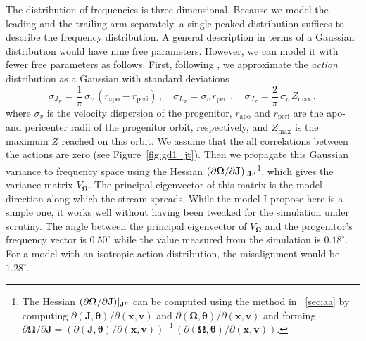 \documentclass[12pt,preprint]{aastex}
\renewcommand{\figurename}{Figure}
\renewcommand{\vec}[1]{\ensuremath{\mathbf{#1}}}
\newcommand{\vecx}{\ensuremath{\vec{x}}}
\newcommand{\vecv}{\ensuremath{\vec{v}}}
\newcommand{\vecj}{\ensuremath{\vec{J}}}
\newcommand{\veco}{\ensuremath{\vec{\Omega}}}
\newcommand{\veca}{\ensuremath{\boldsymbol\theta}}
\newcommand{\sigv}{\ensuremath{\sigma_v}}
\begin{document}
The distribution of frequencies is three dimensional. Because we model
the leading and the trailing arm separately, a single-peaked
distribution suffices to describe the frequency distribution. A
general description in terms of a Gaussian distribution would have
nine free parameters. However, we can model it with fewer free
parameters as follows. First, following \citet{Eyre11a}, we
approximate the \emph{action} distribution as a Gaussian with standard
deviations
\begin{equation}
  \sigma_{J_R} = \frac{1}{\pi}\,\sigv\,\left(r_{\mathrm{apo}}-r_{\mathrm{peri}}\right)\,,\quad 
  \sigma_{L_Z} = \sigv\,r_{\mathrm{peri}}\,,\quad 
  \sigma_{J_Z} = \frac{2}{\pi}\,\sigv\,Z_{\mathrm{max}}\,,
\end{equation}
where $\sigv$ is the velocity dispersion of the progenitor,
$r_{\mathrm{apo}}$ and $r_{\mathrm{peri}}$ are the apo- and pericenter
radii of the progenitor orbit, respectively, and $Z_{\mathrm{max}}$ is
the maximum $Z$ reached on this orbit. We assume that the all
correlations between the actions are zero (see
\figurename~\ref{fig:gd1_jt}). Then we propagate this Gaussian
variance to frequency space using the Hessian $(\partial \veco /
\partial \vecj)\large|_{\vecj^p}$\footnote{The Hessian $(\partial
  \veco / \partial \vecj)\large|_{\vecj^p}$ can be computed using the
  method in \appendixname~\ref{sec:aa} by computing $\partial
  (\vecj,\veca) / \partial (\vecx,\vecv)$ and $\partial (\veco,\veca)
  / \partial (\vecx,\vecv)$ and forming $\partial \veco / \partial
  \vecj = \left(\partial (\vecj,\veca) / \partial
  (\vecx,\vecv)\right)^{-1}\,\left(\partial (\veco,\veca) / \partial
  (\vecx,\vecv)\right)$.}, which gives the variance matrix
$V_\veco$. The principal eigenvector of this matrix is the model
direction along which the stream spreads. While the model I propose
here is a simple one, it works well without having been tweaked for
the simulation under scrutiny. The angle between the principal
eigenvector of $V_\veco$ and the progenitor's frequency vector is
$0.50^\circ$ while the value measured from the simulation is
$0.18^\circ$. For a model with an isotropic action distribution, the
misalignment would be $1.28^\circ$.
\end{document}
